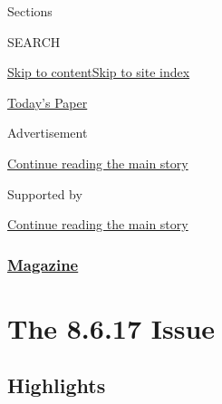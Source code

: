 Sections

SEARCH

\protect\hyperlink{site-content}{Skip to
content}\protect\hyperlink{site-index}{Skip to site index}

\href{https://myaccount.nytimes3xbfgragh.onion/auth/login?response_type=cookie\&client_id=vi}{}

\href{https://www.nytimes3xbfgragh.onion/section/todayspaper}{Today's
Paper}

Advertisement

\protect\hyperlink{after-top}{Continue reading the main story}

Supported by

\protect\hyperlink{after-sponsor}{Continue reading the main story}

\hypertarget{magazine}{%
\subsubsection{\texorpdfstring{\href{/section/magazine}{Magazine}}{Magazine}}\label{magazine}}

\hypertarget{the-8617-issue}{%
\section{The 8.6.17 Issue}\label{the-8617-issue}}

\hypertarget{highlights}{%
\subsection{Highlights}\label{highlights}}

